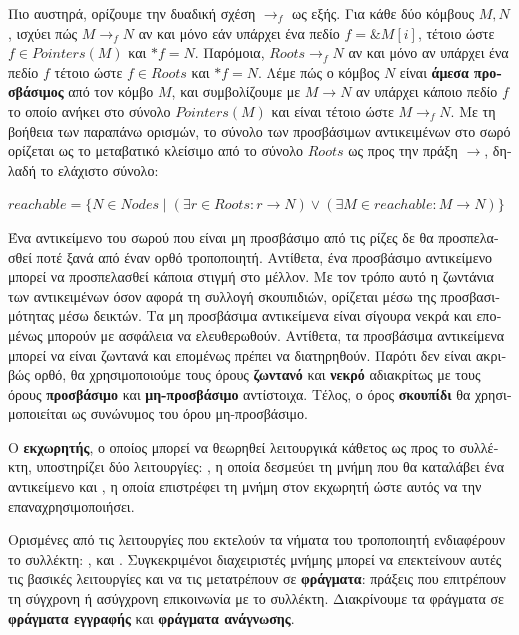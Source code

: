 \begin{greek}
Πιο αυστηρά, ορίζουμε την δυαδική σχέση $\rightarrow_f$ ως εξής.
Για κάθε δύο κόμβους $M, N$, ισχύει πώς $M\rightarrow_f N$ αν
και μόνο εάν υπάρχει ένα πεδίο $f = \& M[i]$, τέτοιο ώστε
$f \in Pointers(M)$ και $*f = N$. Παρόμοια, $Roots \rightarrow_f N$
αν και μόνο αν υπάρχει ένα πεδίο $f$ τέτοιο ώστε $f \in Roots$
και $*f = N$. Λέμε πώς ο κόμβος $N$ είναι \textbf{άμεσα προσβάσιμος}
από τον κόμβο $M$, και συμβολίζουμε με $M \rightarrow N$ αν υπάρχει
κάποιο πεδίο $f$ το οποίο ανήκει στο σύνολο $Pointers(M)$ και είναι
τέτοιο ώστε $M \rightarrow_f N$. Με τη βοήθεια των παραπάνω ορισμών,
το σύνολο των προσβάσιμων αντικειμένων στο σωρό ορίζεται ως το
μεταβατικό κλείσιμο από το σύνολο $Roots$ ως προς την πράξη
$\rightarrow$, δηλαδή το ελάχιστο σύνολο:

$reachable = \{ N \in Nodes \mid (\exists r \in Roots: r \rightarrow N) \lor (\exists M \in reachable: M \rightarrow N) \}$

Ένα αντικείμενο του σωρού που είναι μη προσβάσιμο από τις ρίζες
δε θα προσπελασθεί ποτέ ξανά από έναν ορθό τροποποιητή. Αντίθετα,
ένα προσβάσιμο αντικείμενο μπορεί να προσπελασθεί κάποια στιγμή
στο μέλλον. Με τον τρόπο αυτό η ζωντάνια των αντικειμένων όσον
αφορά τη συλλογή σκουπιδιών, ορίζεται μέσω της προσβασιμότητας
μέσω δεικτών. Τα μη προσβάσιμα αντικείμενα είναι σίγουρα νεκρά
και επομένως μπορούν με ασφάλεια να ελευθερωθούν. Αντίθετα,
τα προσβάσιμα αντικείμενα μπορεί να είναι ζωντανά και επομένως
πρέπει να διατηρηθούν. Παρότι δεν είναι ακριβώς ορθό, θα χρησιμοποιούμε
τους όρους \textbf{ζωντανό} και \textbf{νεκρό} αδιακρίτως με
τους όρους \textbf{προσβάσιμο} και \textbf{μη-προσβάσιμο} αντίστοιχα. 
Τέλος, ο όρος \textbf{σκουπίδι} θα χρησιμοποιείται ως συνώνυμος
του όρου μη-προσβάσιμο.

Ο \textbf{εκχωρητής}, ο οποίος μπορεί να θεωρηθεί λειτουργικά
κάθετος ως προς το συλλέκτη, υποστηρίζει δύο λειτουργίες:
, η οποία δεσμεύει τη μνήμη που θα καταλάβει
ένα αντικείμενο και , η  οποία επιστρέφει
τη μνήμη στον εκχωρητή ώστε αυτός να την επαναχρησιμοποιήσει.

Ορισμένες από τις λειτουργίες που εκτελούν τα νήματα του τροποποιητή
ενδιαφέρουν το συλλέκτη: ,  και
. Συγκεκριμένοι διαχειριστές μνήμης μπορεί να
επεκτείνουν αυτές τις βασικές λειτουργίες και να τις μετατρέπουν
σε \textbf{φράγματα}: πράξεις που επιτρέπουν τη σύγχρονη
ή ασύγχρονη επικοινωνία με το συλλέκτη. Διακρίνουμε τα φράγματα
σε \textbf{φράγματα εγγραφής} και \textbf{φράγματα ανάγνωσης}.


\end{greek}

